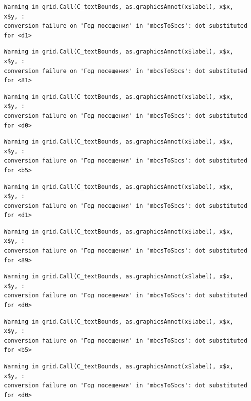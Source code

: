 \documentclass[
  letterpaper,
  DIV=11,
  numbers=noendperiod]{scrartcl}
\begin{document}
\begin{verbatim}
Warning in grid.Call(C_textBounds, as.graphicsAnnot(x$label), x$x, x$y, :
conversion failure on 'Год посещения' in 'mbcsToSbcs': dot substituted for <d1>
\end{verbatim}

\begin{verbatim}
Warning in grid.Call(C_textBounds, as.graphicsAnnot(x$label), x$x, x$y, :
conversion failure on 'Год посещения' in 'mbcsToSbcs': dot substituted for <81>
\end{verbatim}

\begin{verbatim}
Warning in grid.Call(C_textBounds, as.graphicsAnnot(x$label), x$x, x$y, :
conversion failure on 'Год посещения' in 'mbcsToSbcs': dot substituted for <d0>
\end{verbatim}

\begin{verbatim}
Warning in grid.Call(C_textBounds, as.graphicsAnnot(x$label), x$x, x$y, :
conversion failure on 'Год посещения' in 'mbcsToSbcs': dot substituted for <b5>
\end{verbatim}

\begin{verbatim}
Warning in grid.Call(C_textBounds, as.graphicsAnnot(x$label), x$x, x$y, :
conversion failure on 'Год посещения' in 'mbcsToSbcs': dot substituted for <d1>
\end{verbatim}

\begin{verbatim}
Warning in grid.Call(C_textBounds, as.graphicsAnnot(x$label), x$x, x$y, :
conversion failure on 'Год посещения' in 'mbcsToSbcs': dot substituted for <89>
\end{verbatim}

\begin{verbatim}
Warning in grid.Call(C_textBounds, as.graphicsAnnot(x$label), x$x, x$y, :
conversion failure on 'Год посещения' in 'mbcsToSbcs': dot substituted for <d0>
\end{verbatim}

\begin{verbatim}
Warning in grid.Call(C_textBounds, as.graphicsAnnot(x$label), x$x, x$y, :
conversion failure on 'Год посещения' in 'mbcsToSbcs': dot substituted for <b5>
\end{verbatim}

\begin{verbatim}
Warning in grid.Call(C_textBounds, as.graphicsAnnot(x$label), x$x, x$y, :
conversion failure on 'Год посещения' in 'mbcsToSbcs': dot substituted for <d0>
\end{verbatim}
\end{document}
